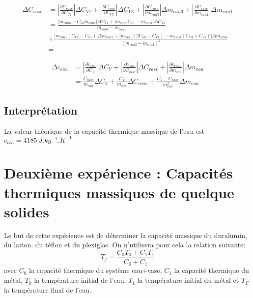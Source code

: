 \documentclass[12pt]{article}
\begin{document}
\begin{align*}
\Delta C_{vase} &= \displaystyle\left\lvert \frac{\partial C_{vase}}{\partial C_{V1}}\right\rvert \Delta C_{V1}+ \displaystyle\left\lvert \frac{\partial C_{vase}}{\partial C_{V3}}\right\rvert \Delta C_{V3} +\displaystyle\left\lvert \frac{\partial C_{vase}}{\partial m_{eau3}}\right\rvert \Delta m_{eau3} + \displaystyle\left\lvert \frac{\partial C_{vase}}{\partial m_{eau1}}\right\rvert \Delta m_{eau1} \\
&= \frac{\displaystyle\left\lvert m_{eau3}-C_{V3}m_{eau1}\right\rvert \Delta C_{V1} + \displaystyle\left\lvert m_{eau3}C_{V1}-m_{eau1}\right\rvert \Delta C_{V3}}{m_{eau3}-m_{eau1}}\\
&+ \frac{\displaystyle\left\lvert m_{eau1}(C_{V3}-C_{V1})\right\rvert \Delta m_{eau1}+\displaystyle\left\lvert m_{eau1}(2C_{V3}-C_{V1})-m_{eau3}(C_{V3}+C_{V1})\right\rvert \Delta m_{eau3} }{(m_{eau3}-m_{eau1})^2} \\
&=
\end{align*}

\begin{align*}
\Delta c_{eau} &= \displaystyle\left\lvert \frac{\partial c_{eau}}{\partial C_{V}}\right\rvert \Delta C_{V} + \displaystyle\left\lvert \frac{\partial c_{eau}}{\partial C_{vase}}\right\rvert \Delta C_{vase} + \displaystyle\left\lvert  \frac{\partial c_{Veau}}{\partial m_{eau}}\right\rvert \Delta m_{eau} \\
	&=	\frac{C_{vase}}{m_{eau}}\Delta C_{V} + \frac{C_{V}}{m_{eau}}\Delta C_{vase} + \frac{C_{V}-C_{vase}}{m_{eau}^2}\Delta m_{eau}
\end{align*}


\subsection{Interprétation}

La valeur théorique de la capacité thermique massique de l'eau est $c_{vth }=4185 ~ J.kg^{-1}.K^{-1}$

\section{Deuxième expérience : Capacités thermiques massiques de quelque solides}

Le but de cette expérience est de déterminer la capacité massique du duralumin, du laiton, du téflon et du plexiglas. On n'utilisera pour cela la relation suivante:
\begin{equation}
T_f=\frac{C_0T_0+C_1T_1}{C_0+C_1}
\label{EquationTf}
\end{equation}
avec $C_0$ la capacité thermique du système {eau+vase}, $C_1$ la capacité thermique du métal, $T_0$ la température initial de l'eau, $T_1$ la température initial du métal et $T_F$ la température final de l'eau.
\end{document}
